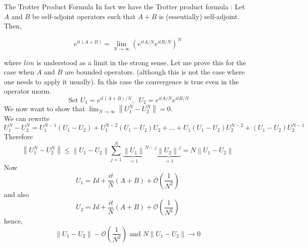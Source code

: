 \documentclass[11pt, xcolor=dvipsnames,aspectratio=169]{beamer}
\begin{document}
\begin{frame}{The Trotter Product Formula}
In fact we have the Trotter product formula :
Let $A$ and $B$ be self-adjoint operators such that $A+B$ is (esseutially)
self-adjoint. Then,

\begin{equation}
e^{i t(A+B)}=\lim _{N \rightarrow \infty}\left(e^{i t A / N} e^{i t B / N}\right)^{N}
\end{equation}

where $lim$ is understood as a limit in the strong sense.
Let me prove this for the case when $A$ and $B$ are bounded operators.
(although this is not the case where one needs to apply it usually). In this case
the convergence is true even in the operator morm.
\begin{equation}
\text { Set } U_{1}=e^{i t(A+B) / N},\;\; U_{2}=e^{i t A / N} e^{i t B / N}
\end{equation}
We now want to show that $\lim _{N \rightarrow \infty}\left\|U_{1}^{N}-U_{2}^{N}\right\|=0$.\\
We can rewrite
\begin{equation}
U_{1}^{N}-U_{2}^{N}=U_{1}^{N-1}\left(U_{1}-U_{2}\right)+U_{1}^{N-2}\left(U_{1}-U_{2}\right) U_{2}+\ldots+U_{1}\left(U_{1}-U_{2}\right) U_{2}^{N-2}+\left(U_{1}-U_{2}\right) U_{2}^{N-1}
\end{equation}
Therefore
\begin{equation}
\left\|U_{1}^{N}-U_{2}^{N}\right\| \leqslant\left\|U_{1}-U_{2}\right\| \sum_{j=1}^{N} {\underbrace{\left\|U_{1}\right\|}_{=1}}^{N-j} \underbrace{\left\|U_{2}\right\|^{j}}_{=1}=N\left\|U_{1}-U_{2}\right\| 
\end{equation}
 Now 
\begin{equation}
    U_{1}=Id+\frac{i t}{N}(A+B)+\mathcal{O}\left(\frac{1}{N^{2}}\right)
\end{equation}
and also
\begin{equation}
    U_{2}=Id+\frac{i t}{N}(A+B)+\mathcal{O}\left(\frac{1}{N^{2}}\right)
\end{equation}
hence,
\begin{equation}
\left\|U_{1}-U_{2}\right\|-\mathcal{O}\left(\frac{1}{N^{2}}\right) \text { and } N\left\|U_{1}-U_{2}\right\| \rightarrow 0
\end{equation}
    
    
    
    
\end{frame}
\end{document}
